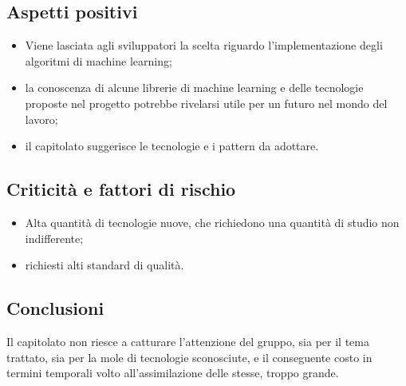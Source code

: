 \subsection{Aspetti positivi}
\begin{itemize}
    \item Viene lasciata agli sviluppatori la scelta riguardo l'implementazione degli algoritmi di machine learning;
    \item la conoscenza di alcune librerie di machine learning e delle tecnologie proposte nel progetto potrebbe rivelarsi utile per un futuro nel mondo del lavoro;
    \item il capitolato suggerisce le tecnologie e i pattern da adottare.
\end{itemize}
\subsection{Criticità e fattori di rischio}
\begin{itemize}
    \item Alta quantità di tecnologie nuove, che richiedono una quantità di studio non indifferente;
    \item richiesti alti standard di qualità.
\end{itemize}
\subsection{Conclusioni}
Il capitolato non riesce a catturare l'attenzione del gruppo, sia per il tema trattato, sia per la mole di tecnologie sconosciute, e il conseguente costo in termini temporali volto all'assimilazione delle stesse, troppo grande.

